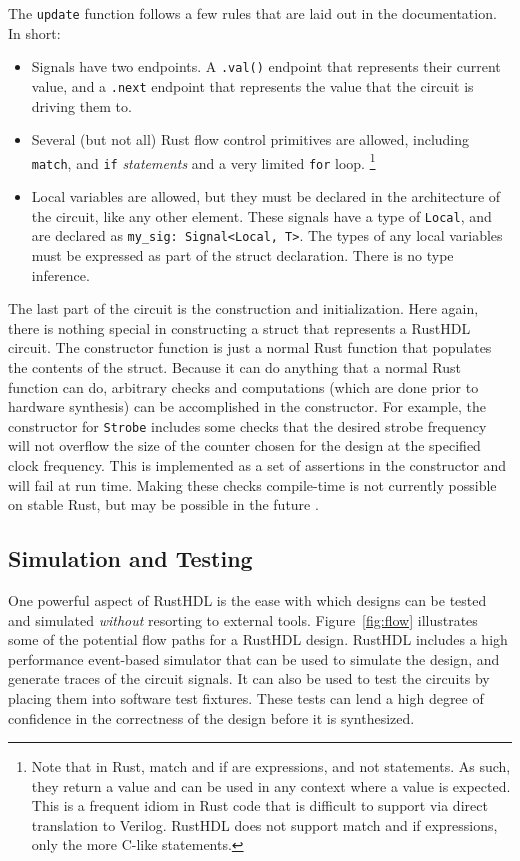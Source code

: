 \documentclass[conference]{IEEEtran}
\begin{document}
The \verb|update| function follows a few rules that are laid out in the documentation.  In short:
\begin{itemize}
  \item Signals have two endpoints.  A \verb|.val()| endpoint that represents their current value, and a \verb|.next| 
    endpoint that represents the value that the circuit is driving them to.
  \item Several (but not all) Rust flow control primitives are allowed, including \verb|match|, and  \verb|if| \emph{statements} 
  and a very limited \verb|for| loop. \footnote{Note that in Rust, match and if are expressions, and not statements. As 
  such, they return a value and can be used in any context where a value is expected.  This is a frequent idiom in Rust code that
  is difficult to support via direct translation to Verilog.  RustHDL does not support match and if expressions, 
  only the more C-like statements.}
  \item Local variables are allowed, but they must be declared in the architecture of the circuit, like any other element.
  These signals have a type of \verb|Local|, and are declared as \verb|my_sig: Signal<Local, T>|.  The types of any local 
  variables must be expressed as part of the struct declaration.  There is no type inference.
\end{itemize}

The last part of the circuit is the construction and initialization.  Here again, there is nothing special in constructing 
a struct that represents a RustHDL circuit.  The 
constructor function is just a normal Rust function that populates the contents of the struct.  Because it can do anything
that a normal Rust function can do, arbitrary checks and computations (which are done prior to hardware synthesis) can be 
accomplished in the constructor.  For example, the constructor for \verb|Strobe| includes some checks that the 
desired strobe frequency will not overflow the size of the counter chosen for the design at the specified clock frequency.  
This is implemented as a set  of assertions in the constructor and will fail at run time.  Making these checks 
compile-time is not currently possible on stable Rust, but may be possible in the future \cite{b11}.

\subsection{Simulation and Testing}

One powerful aspect of RustHDL is the ease with which designs can be tested and simulated \emph{without} 
resorting to external tools.  Figure~\ref{fig:flow} illustrates some of the potential flow paths for a 
RustHDL design.  RustHDL includes a high
performance event-based simulator that can be used to simulate the design, and generate traces of the circuit
signals.  It can also be used to test the circuits by placing them into software test fixtures. 
These tests can lend a high degree of confidence in the correctness of the design before it is synthesized.
\end{document}

